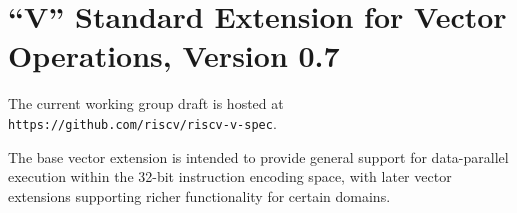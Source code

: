 \chapter{``V'' Standard Extension for Vector Operations, Version 0.7}
\label{sec:vector}

The current working group draft is hosted at {\tt
  https://github.com/riscv/riscv-v-spec}.

\begin{commentary}
The base vector extension is intended to provide general support for
data-parallel execution within the 32-bit instruction encoding space,
with later vector extensions supporting richer functionality for
certain domains.
\end{commentary}
  


